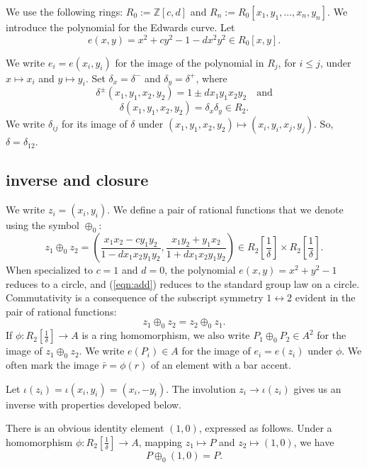 \documentclass{llncs}
\newcommand{\ring}[1]{\mathbb{#1}}
\newcommand{\f}[1]{\frac{1}{#1}}
\begin{document}
We use the following rings: $R_0 := \ring{Z}[c,d]$ and $R_n :=
R_0[x_1,y_1,\ldots,x_n,y_n]$.  We introduce the polynomial for the
Edwards curve.  Let
\begin{equation}
e(x,y) = x^2 + c y^2 -1 - d x^2 y^2 \in  R_0[x,y].
\end{equation}

We write $e_i = e(x_i,y_i)$ for the image of the polynomial in $R_j$,
for $i\le j$, under $x\mapsto x_i$ and $y\mapsto y_i$.  Set
$\delta_x = \delta^-$ and $\delta_y = \delta^+$, where
\[\delta^{\pm} (x_1,y_1,x_2,y_2) = 1\pm d x_1 y_1 x_2 y_2\quad\text{and}\] 
\[
\delta(x_1,y_1,x_2,y_2) = \delta_x\delta_y\in R_2.
\]
We write $\delta_{ij}$ for its image of $\delta$ under
$(x_1,y_1,x_2,y_2)\mapsto (x_i,y_i,x_j,y_j)$.  So,
$\delta=\delta_{12}$.

\subsection{inverse and closure}

We write $z_i = (x_i,y_i)$.
We define a pair of rational functions that we denote using
the symbol $\oplus_0$:
\begin{equation}\label{eqn:add}
z_1 \oplus_0 z_2 =  \left(\frac{x_1 x_2 - c y_1 y_2}{1 - d x_1 x_2 y_1 y_2},
\frac{x_1 y_2 + y_1 x_2}{1+d x_1 x_2 y_1 y_2}\right) 
\in R_2[\f{\delta}]\times R_2[\f{\delta}].
\end{equation}
When specialized to $c=1$ and $d=0$, the polynomial $e(x,y)=x^2+y^2-1$ reduces to
a circle, and (\ref{eqn:add}) reduces to the standard group
law on a circle.
Commutativity is a consequence of the subscript symmetry
$1\leftrightarrow 2$ evident in the pair of rational functions:
\[
z_1 \oplus_0 z_2 = z_2\oplus_0 z_1.
\]
If $\phi:R_2[\f{\delta}]\to A$ is a ring homomorphism, we also write
$P_1\oplus_0 P_2\in A^2$ for the image of $z_1\oplus_0 z_2$.  We write
$e(P_i)\in A$ for the image of $e_i=e(z_i)$ under $\phi$.  We often
mark the image $\bar r=\phi(r)$ of an element with a bar accent.

Let $\iota(z_i) =\iota(x_i,y_i) = (x_i,-y_i)$.  The involution $z_i\to
\iota(z_i)$ gives us an inverse with properties developed below.

There is an obvious identity element $(1,0)$, expressed as follows.
Under a homomorphism $\phi:R_2[\f{\delta}]\to A$, mapping $z_1\mapsto
P$ and $z_2\mapsto (1,0)$, we have
\begin{equation}
P\oplus_0(1,0) = P.
\end{equation}
\end{document}
